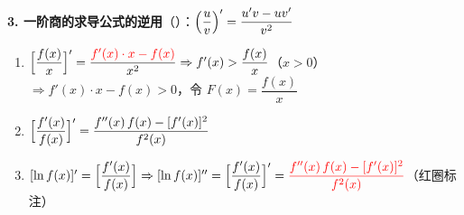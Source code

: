 \documentclass[a4paper,12pt]{article}
\begin{document}
\begin{minipage}[t]{0.46\textwidth}
        \vspace{0.8em}

        \textbf{3. 一阶商的求导公式的逆用}（{\color{red}{经典}}）：$\Bigl(\dfrac{u}{v}\Bigr)' = \dfrac{u'v - uv'}{v^{2}}$
        \begin{enumerate}[label=\alph*., leftmargin=2em, itemsep=0.6em]
            \item $\Bigl[\dfrac{f(x)}{x}\Bigr]' = \dfrac{{\color{red}{f'(x)\cdot x - f(x)}}}{x^{2}} \Rightarrow f'(x) > \dfrac{f(x)}{x}$（$x > 0$）$\Rightarrow f'(x)\cdot x - f(x) > 0$，令 $F(x) = \dfrac{f(x)}{x}$
            \item $\Bigl[\dfrac{f'(x)}{f(x)}\Bigr]' = \dfrac{f''(x)\,f(x) - [f'(x)]^{2}}{f^{2}(x)}$
            \item $[\ln f(x)]' = \Bigl[\dfrac{f'(x)}{f(x)}\Bigr] \Rightarrow [\ln f(x)]'' = \Bigl[\dfrac{f'(x)}{f(x)}\Bigr]' = {\color{red}{\dfrac{f''(x)\,f(x) - [f'(x)]^{2}}{f^{2}(x)}}}$（红圈标注）
        \end{enumerate}
    \end{minipage}
    \hfill
\end{document}
